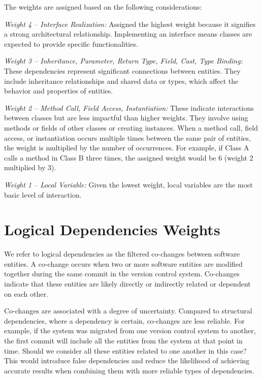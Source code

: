 The weights are assigned based on the following considerations:

\textit{Weight 4 – Interface Realization:} Assigned the highest weight because it signifies a strong architectural relationship. Implementing an interface means classes are expected to provide specific functionalities.

\textit{Weight 3 – Inheritance, Parameter, Return Type, Field, Cast, Type Binding:} These dependencies represent significant connections between entities. They include inheritance relationships and shared data or types, which affect the behavior and properties of entities.

\textit{Weight 2 – Method Call, Field Access, Instantiation:} These indicate interactions between classes but are less impactful than higher weights. They involve using methods or fields of other classes or creating instances. When a method call, field access, or instantiation occurs multiple times between the same pair of entities, the weight is multiplied by the number of occurrences. For example, if Class A calls a method in Class B three times, the assigned weight would be 6 (weight 2 multiplied by 3).

\textit{Weight 1 – Local Variable:} Given the lowest weight, local variables are the most basic level of interaction.



\section{Logical Dependencies Weights}
\label{subsec:ld}

We refer to logical dependencies as the filtered co-changes between software entities. A co-change occurs when two or more software entities are modified together during the same commit in the version control system. Co-changes indicate that these entities are likely directly or indirectly related or dependent on each other.

Co-changes are associated with a degree of uncertainty. Compared to structural dependencies, where a dependency is certain, co-changes are less reliable. For example, if the system was migrated from one version control system to another, the first commit will include all the entities from the system at that point in time. Should we consider all these entities related to one another in this case? This would introduce false dependencies and reduce the likelihood of achieving accurate results when combining them with more reliable types of dependencies.


